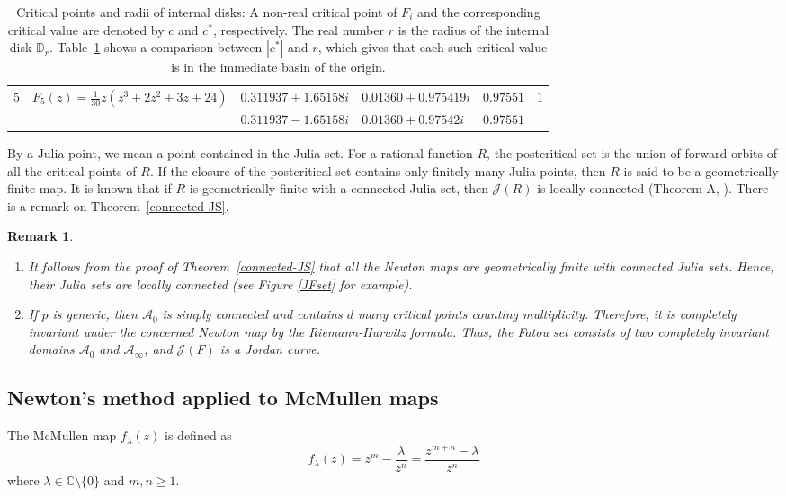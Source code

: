\documentclass[12pt]{article}
\newtheorem{rem}{Remark}[section]
\numberwithin{equation}{section}
\begin{document}
\begin{table}[]
\begin{tabular}{|p{0.6cm}|p{5.5cm}| p{2.0cm}| p{2.0cm}| p{1.5cm}| p{1.4cm}|}
		\hline
		\multirow{3}{10em}{5} & \multirow{3}{10em}{ $F_5 (z)=\frac{1}{30}z(z^3+2z^2+3z+24)$}  & $ 0.311937+ 1.65158 i $ & $ 0.01360+ 0.975419 i $ & $ 0.97551 $ & \multirow{3}{2em}{\centering $1$}  \\
		\cline{3-5}
		&  & $ 0.311937- 1.65158 i $ &$ 0.01360+ 0.97542 i $ & $ 0.97551 $ & \\
		\hline
	\end{tabular}
	\caption{Critical points and radii of internal disks: A non-real critical point of $F_i$ and the corresponding  critical value are denoted by $c$ and $c^*$, respectively. The real number $r$ is the radius of the internal disk $\mathbb{D}_r$. Table~\ref{cr.pt_cr.val} shows a comparison between $|c^*|$ and $r$, which gives that each such critical value is in the immediate basin of the origin.}
	\label{cr.pt_cr.val}
\end{table}
By a Julia point, we mean a point contained in the Julia set. For a rational function $R$, the postcritical set is the union of forward orbits of all the critical points of $R$. If the closure of the postcritical set contains only finitely many Julia points, then $R$ is said to be a geometrically finite map. It is known that if $R$ is geometrically finite with a connected Julia set, then $\mathcal{J}(R)$ is locally connected (Theorem A, \cite{Lei1996}). There is a remark on Theorem~\ref{connected-JS}.
\begin{rem}
	\begin{enumerate}
		\item It follows from the proof of Theorem~\ref{connected-JS} that all the Newton maps are geometrically finite with connected Julia sets. Hence, their Julia sets are locally connected (see Figure \ref{JFset} for example).
\item If $p$ is generic, then  $\mathcal{A}_0$ is simply connected and contains $d$ many critical points counting multiplicity. Therefore, it is completely invariant under the concerned Newton map by the Riemann-Hurwitz formula. Thus, the Fatou set consists of two completely invariant domains $\mathcal{A}_0$ and $\mathcal{A}_\infty$, and  $\mathcal{J}(F)$ is a Jordan curve. 
\end{enumerate}
 \end{rem}
\subsection{Newton's method applied to McMullen maps}
The McMullen map $f_\lambda(z)$ is defined as
$$f_\lambda(z)=z^m-\frac{\lambda}{z^n}=\frac{z^{m+n}-\lambda}{z^n}$$
where $\lambda \in \mathbb{C} \setminus \{0\}$ and $m,n \geq 1$. 
\end{document}
